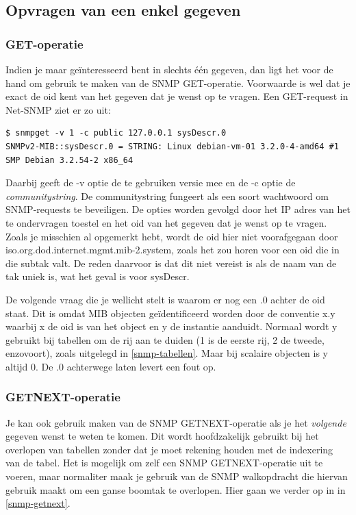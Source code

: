 \subsection{Opvragen van een enkel gegeven}

\subsubsection{GET-operatie}

Indien je maar geïnteresseerd bent in slechts één gegeven, dan ligt het voor de hand om gebruik te maken van de SNMP GET-operatie.
Voorwaarde is wel dat je exact de \gls{oid} kent van het gegeven dat je wenst op te vragen.
Een GET-request in Net-SNMP ziet er zo uit:

\begin{lstlisting}[float=h, caption={SNMP GET-opdracht}, label=netsnmp-get]
$ snmpget -v 1 -c public 127.0.0.1 sysDescr.0
SNMPv2-MIB::sysDescr.0 = STRING: Linux debian-vm-01 3.2.0-4-amd64 #1 SMP Debian 3.2.54-2 x86_64
\end{lstlisting}

Daarbij geeft de -v optie de te gebruiken versie mee en de -c optie de \textit{communitystring}.
De communitystring fungeert als een soort wachtwoord om SNMP-requests te beveiligen.
De opties worden gevolgd door het IP adres van het te ondervragen toestel en het \gls{oid} van het gegeven dat je wenst op te vragen.
Zoals je misschien al opgemerkt hebt, wordt de \gls{oid} hier niet voorafgegaan door iso.org.dod.internet.mgmt.mib-2.system, zoals het zou horen
voor een \gls{oid} die in die subtak valt. De reden daarvoor is dat dit niet vereist is als de naam van de tak uniek is, wat het geval is voor sysDescr.

De volgende vraag die je wellicht stelt is waarom er nog een .0 achter de \gls{oid} staat.
Dit is omdat MIB objecten geïdentificeerd worden door de conventie x.y waarbij x de \gls{oid} is van het object
en y de instantie aanduidt. Normaal wordt y gebruikt bij tabellen om de rij aan te duiden (1 is de eerste rij, 2 de tweede, enzovoort),
zoals uitgelegd in \cref{snmp-tabellen}.
Maar bij scalaire objecten is y altijd 0. De .0 achterwege laten levert een fout op.\cite{essentialsnmp}

\subsubsection{GETNEXT-operatie}

Je kan ook gebruik maken van de SNMP GETNEXT-operatie als je het \emph{volgende} gegeven wenst te weten te komen.
Dit wordt hoofdzakelijk gebruikt bij het overlopen van tabellen zonder dat je moet rekening houden met de indexering van de tabel.
Het is mogelijk om zelf een SNMP GETNEXT-operatie uit te voeren, maar normaliter maak je gebruik van de SNMP walkopdracht die
hiervan gebruik maakt om een ganse boomtak te overlopen. Hier gaan we verder op in in \cref{snmp-getnext}.

